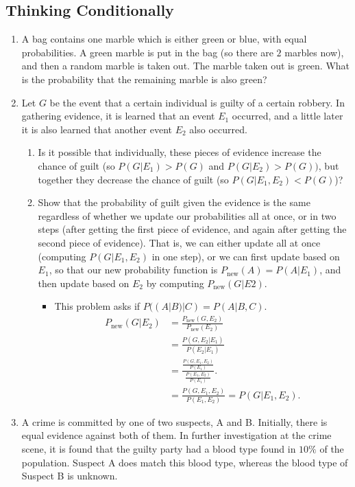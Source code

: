\documentclass{article}
\begin{document}
\subsection{Thinking Conditionally}
\begin{enumerate}
	\item A bag contains one marble which is either green or blue, with equal probabilities. A green marble is put in the bag (so there are $2$ marbles now), and then a random marble is taken out. The marble taken out is green. What is the probability that the remaining marble is also green?
	\item Let $G$ be the event that a certain individual is guilty of a certain robbery. In gathering evidence, it is learned that an event $E_1$ occurred, and a little later it is also learned that another event $E_2$ also occurred.
		\begin{enumerate}
			\item Is it possible that individually, these pieces of evidence increase the chance of guilt (so $P(G|E_1) > P (G)$ and $P(G|E_2) > P (G))$, but together they decrease the chance of guilt (so $P(G|E_1, E_2) < P(G)$)?
			\item Show that the probability of guilt given the evidence is the same regardless of whether we update our probabilities all at once, or in two steps (after getting the first piece of evidence, and again after getting the second piece of evidence). That is, we can either update all at once (computing $P(G|E_1, E_2)$ in one step), or we can first update based on $E_1$, so that our new probability function is $P_{\operatorname{new}}(A) = P (A|E_1)$, and then update based on $E_2$ by computing $P_{\operatorname{new}}(G|E 2)$.
				\begin{itemize}
					\item This problem asks if $P((A|B)|C) = P(A|B, C)$.
					$$
					\begin{aligned}
					P_{\operatorname{new}}(G|E_2) &= \frac{P_{\operatorname{new}}(G, E_2)}{P_{\operatorname{new}}(E_2)} \\
					&= \frac{P(G, E_2|E_1)}{P(E_2|E_1)} \\
					&= \frac{\frac{P(G, E_1, E_2)}{P(E_1)}}{\frac{P(E_1, E_2)}{P(E_1)}}. \\
					&= \frac{P(G, E_1, E_2)}{P(E_1, E_2)} = P(G|E_1, E_2).
					\end{aligned}
					$$
				\end{itemize}
		\end{enumerate}
	\item A crime is committed by one of two suspects, A and B. Initially, there is equal evidence against both of them. In further investigation at the crime scene, it is found that the guilty party had a blood type found in $10\%$ of the population. Suspect A does match this blood type, whereas the blood type of Suspect B is unknown.

\end{enumerate}
\end{document}
